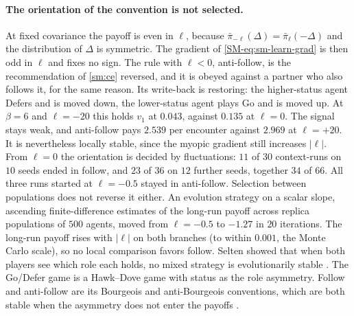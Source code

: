 \documentclass[
  aps,prx,
  preprint,
  superscriptaddress,
  nofootinbib
]{revtex4-2}
\newcommand{\pibar}{\bar\pi}
\begin{document}
\paragraph{The orientation of the convention is not selected.} At fixed covariance the payoff is even in $\ell$, because $\pibar_{-\ell}(\Delta)=\pibar_\ell(-\Delta)$ and the distribution of $\Delta$ is symmetric. The gradient of \cref{SM-eq:sm-learn-grad} is then odd in $\ell$ and fixes no sign. The rule with $\ell<0$, anti-follow, is the recommendation of \cref{sm:ce} reversed, and it is obeyed against a partner who also follows it, for the same reason. Its write-back is restoring: the higher-status agent Defers and is moved down, the lower-status agent plays Go and is moved up. At $\beta=6$ and $\ell=-20$ this holds $v_1$ at $0.043$, against $0.135$ at $\ell=0$. The signal stays weak, and anti-follow pays $2.539$ per encounter against $2.969$ at $\ell=+20$. It is nevertheless locally stable, since the myopic gradient still increases $|\ell|$. From $\ell=0$ the orientation is decided by fluctuations: $11$ of $30$ context-runs on $10$ seeds ended in follow, and $23$ of $36$ on $12$ further seeds, together $34$ of $66$. All three runs started at $\ell=-0.5$ stayed in anti-follow. Selection between populations does not reverse it either. An evolution strategy on a scalar slope, ascending finite-difference estimates of the long-run payoff across replica populations of $500$ agents, moved from $\ell=-0.5$ to $-1.27$ in $20$ iterations. The long-run payoff rises with $|\ell|$ on both branches (to within $0.001$, the Monte Carlo scale), so no local comparison favors follow. Selten showed that when both players see which role each holds, no mixed strategy is evolutionarily stable \cite{selten1980}. The Go/Defer game is a Hawk--Dove game with status as the role asymmetry. Follow and anti-follow are its Bourgeois and anti-Bourgeois conventions, which are both stable when the asymmetry does not enter the payoffs \cite{maynardsmith1976,maynardsmith1982}.
\end{document}
